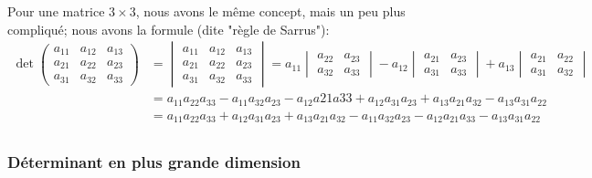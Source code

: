 Pour une matrice $3\times 3$, nous avons le même concept, mais un peu plus compliqué; nous avons la formule (dite "règle de Sarrus"):
\begin{subequations}
\begin{align}
    \det
    \begin{pmatrix}
        a_{11}    &   a_{12}    &   a_{13}    \\
        a_{21}    &   a_{22}    &   a_{23}    \\
        a_{31}    &   a_{32}    &   a_{33}
    \end{pmatrix}
    &=
    \begin{vmatrix}
        a_{11}    &   a_{12}    &   a_{13}    \\
        a_{21}    &   a_{22}    &   a_{23}    \\
        a_{31}    &   a_{32}    &   a_{33}
    \end{vmatrix}=
    a_{11}\begin{vmatrix}
        a_{22}  &   a_{23}    \\
        a_{32}    &   a_{33}
    \end{vmatrix}-
    a_{12}\begin{vmatrix}
        a_{21}  &   a_{23}    \\
        a_{31}    &   a_{33}
    \end{vmatrix}+
    a_{13}\begin{vmatrix}
        a_{21}  &   a_{22}    \\
        a_{31}    &   a_{32}
    \end{vmatrix}\\
    &= a_{11}a_{22}a_{33} - a_{11}a_{32}a_{23} - a_{12}a{21}a{33}+a_{12}a_{31}a_{23}+a_{13}a_{21}a_{32}-a_{13}a_{31}a_{22}\\
    &= a_{11}a_{22}a_{33}+a_{12}a_{31}a_{23}+a_{13}a_{21}a_{32}
     - a_{11}a_{32}a_{23} - a_{12}a_{21}a_{33}-a_{13}a_{31}a_{22}\\
\end{align}
\end{subequations}

\subsubsection{Déterminant en plus grande dimension}
\label{SUBSUBSEC_calculDeterminantMat}

